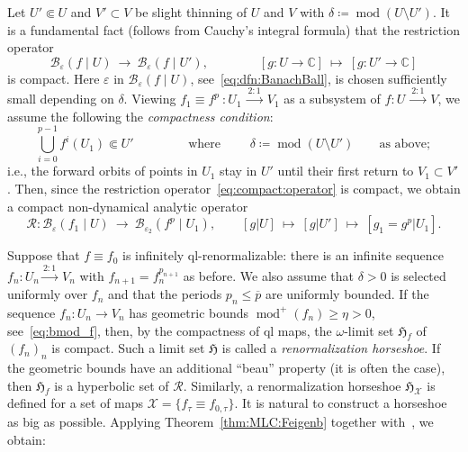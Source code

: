 \documentclass[twoside,leqno]{article}
\theoremstyle{plain}
\newcommand{\C}{{\mathbb{C}}}
\renewcommand{\mod}{\operatorname{mod}}
\newcommand{\Hors}{{\mathfrak H}}
\renewcommand{\bmod}{ {\operatorname{mod}^+}}
\newcommand{\RR}{{\mathcal R}}
\begin{document}
 Let $U'\Subset U$ and $V'\subset V$ be slight thinning of $U$ and $V$ with $\delta\coloneqq \mod(U\setminus U')$. It is a fundamental fact (follows from Cauchy's integral formula) that the restriction operator 
\begin{equation}
\label{eq:compact:operator}
\mathcal B_\varepsilon (f\mid U)\ \to \  \mathcal B_\varepsilon (f\mid U'),\qquad\qquad [g\colon U\to \C]\ \mapsto \ [g\colon U'\to \C]
\end{equation}
is compact. Here $\varepsilon$ in $\mathcal B_\varepsilon (f\mid U)$, see~\eqref{eq:dfn:BanachBall}, is chosen sufficiently small depending on $\delta$. Viewing $f_1\equiv f^p\ \colon U_1\ \overset{2:1}\longrightarrow\ V_1$ as a subsystem of $f\colon U\ \overset{2:1}\longrightarrow\ V$,  we assume the following the \emph{compactness condition}:
\begin{equation}
\label{eq:dfn:delta}   \bigcup_{i=0}^{p-1} f^i(U_1)\Subset U'\qquad\qquad\text{ where }\qquad   \delta\coloneqq \mod(U\setminus U') \qquad \text{as above};
\end{equation}
i.e., the forward orbits of points in $U_1$ stay in $U'$ until their first return to $V_1\subset V'$. Then, since the restriction operator~\eqref{eq:compact:operator} is compact, we obtain a compact non-dynamical analytic operator 
\begin{equation}
    \label{eq:RR:QL}
\RR \colon \mathcal B_\varepsilon (f_1\mid U)\ \to  \  \mathcal B_{\varepsilon_2} (f^p\mid U_1),\qquad [g| U] \ \mapsto \ [g| U'] \ \mapsto \ [g_1=g^p|U_1].
\end{equation}




Suppose that $f\equiv f_0$ is infinitely ql-renormalizable: there is an infinite sequence $f_n\colon U_n  \overset{2:1}\longrightarrow\ V_n$ with $f_{n+1}=f_n^{p_{n+1}}$ as before. We also assume that $\delta>0$ is selected uniformly over $f_n$ and that the periods $p_n\le \overline p$ are uniformly bounded. If the sequence $f_n\colon U_n\to V_n$ has geometric bounds $\bmod (f_n)\ge \eta>0$, see~\eqref{eq:bmod_f}, then, by the compactness of ql maps, the $\omega$-limit set $\Hors_f$ of $(f_n)_n$ is compact. Such a limit set $\Hors$ is called a \emph{renormalization horseshoe}. If the geometric bounds have an additional ``beau'' property (it is often the case), then $\Hors_f$ is a hyperbolic set of $\RR$. Similarly, a renormalization horseshoe $\Hors_{\mathcal X}$ is defined for a set of maps $\mathcal X=\{f_\tau\equiv f_{0,\tau}\}$. It is natural to construct a horseshoe as big as possible. Applying Theorem~\ref{thm:MLC:Feigenb} together with~\cite{LyuFeigen}, we obtain:
\end{document}
